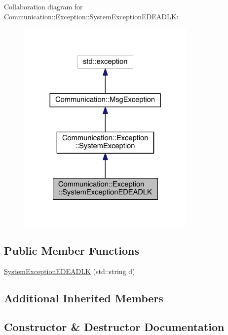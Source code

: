 Collaboration diagram for Communication\+:\+:Exception\+:\+:System\+Exception\+E\+D\+E\+A\+D\+L\+K\+:\nopagebreak
\begin{figure}[H]
\begin{center}
\leavevmode
\includegraphics[width=248pt]{class_communication_1_1_exception_1_1_system_exception_e_d_e_a_d_l_k__coll__graph}
\end{center}
\end{figure}
\subsection*{Public Member Functions}
\begin{DoxyCompactItemize}
\item 
\hyperlink{class_communication_1_1_exception_1_1_system_exception_e_d_e_a_d_l_k_a9303c678dbefc7c103cd984a17ce2d6e}{System\+Exception\+E\+D\+E\+A\+D\+L\+K} (std\+::string d)
\end{DoxyCompactItemize}
\subsection*{Additional Inherited Members}


\subsection{Constructor \& Destructor Documentation}
\hypertarget{class_communication_1_1_exception_1_1_system_exception_e_d_e_a_d_l_k_a9303c678dbefc7c103cd984a17ce2d6e}{}
